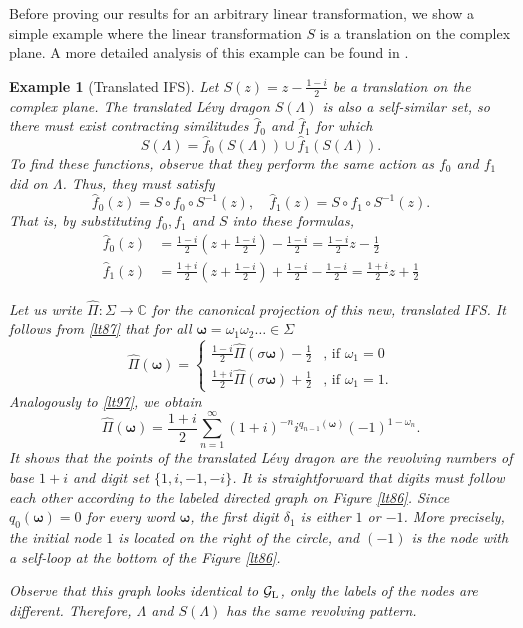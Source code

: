 \documentclass[12pt, a4paper]{amsart}
\newtheorem{example}[theorem]{Example}
\numberwithin{equation}{section}
\numberwithin{theorem}{section}
\begin{document}
Before proving our results for an arbitrary linear transformation, we show a simple example where the linear transformation $S$ is a translation on the complex plane. A more detailed analysis of this example can be found in \cite{Leung-2026}.
\begin{example}[Translated IFS]\label{lt88}
  Let $S(z)=z-\frac{1-i}{2}$ be a translation on the complex plane. The translated L\'evy dragon $S(\Lambda)$ is also a self-similar set, so there must exist contracting similitudes $\widehat{f}_0$ and $\widehat{f}_1$ for which 
  \begin{equation}\label{lt87}
    S(\Lambda)=\widehat{f}_0(S(\Lambda))\cup\widehat{f}_1(S(\Lambda)).
  \end{equation}
  To find these functions, observe that they perform the same action as $f_0$ and $f_1$ did on $\Lambda$. Thus, they must satisfy
  \[
    \widehat{f}_0(z)=S\circ f_0\circ S^{-1}(z),\quad
    \widehat{f}_1(z)=S\circ f_1\circ S^{-1}(z).
  \]
  That is, by substituting $f_0, f_1$ and $S$ into these formulas, 
  \begin{align*}
    \widehat{f}_0(z)&=\frac{1-i}{2}\left(z+\frac{1-i}{2}\right)-\frac{1-i}{2}= 
    \frac{1-i}{2}z-\frac{1}{2}\\
    \widehat{f}_1(z)&=\frac{1+i}{2}\left(z+\frac{1-i}{2}\right)+\frac{1-i}{2}-\frac{1-i}{2}=
    \frac{1+i}{2}z+\frac{1}{2}
  \end{align*}

  Let us write $\widehat{\Pi}:\Sigma\to\mathbb{C}$ for the canonical projection of this new, translated IFS. It follows from \eqref{lt87} that for all $\pmb{\omega}=\omega_1\omega_2\dots\in\Sigma$
  \[
    \widehat{\Pi}(\pmb{\omega})=\begin{cases}
        \frac{1-i}{2}\widehat{\Pi}(\sigma\pmb{\omega})-\frac{1}{2} &\mbox{, if } \omega_1=0 \\
        \frac{1+i}{2}\widehat{\Pi}(\sigma\pmb{\omega})+\frac{1}{2} &\mbox{, if } \omega_1=1.
    \end{cases}
  \]
  Analogously to \eqref{lt97}, we obtain
  \[
    \widehat{\Pi}(\pmb{\omega})=\frac{1+i}{2}\sum_{n=1}^{\infty} (1+i)^{-n}i^{q_{n-1}(\pmb{\omega})}(-1)^{1-\omega_n}.
  \] 
  It shows that the points of the translated L\'evy dragon are the revolving numbers of base $1+i$ and digit set $\{1,i,-1,-i\}$. It is straightforward that digits must follow each other according to the labeled directed graph on Figure \ref{lt86}. Since $q_0(\pmb{\omega})=0$ for every word $\pmb{\omega}$, the first digit $\delta_1$ is either $1$ or $-1$. More precisely, the initial node $1$ is located on the right of the circle, and $(-1)$ is the node with a self-loop at the bottom of the Figure \ref{lt86}.
	
  
  Observe that this graph looks identical to $\mathcal{G}_{\rm L}$, only the labels of the nodes are different. Therefore, $\Lambda$ and $S(\Lambda)$ has the same revolving pattern.

\end{example}
\end{document}

